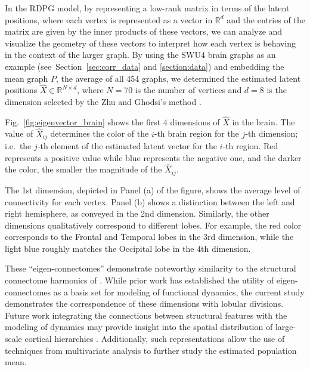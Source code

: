 \documentclass[journal,twoside,web]{ieeecolor}
\renewcommand{\Re}{\mathbb{R}}
\begin{document}
In the RDPG model, by representing a low-rank matrix in terms of the latent positions, where each vertex is represented as a vector in $\Re^d$ and the entries of the matrix are given by the inner products of these vectors, we can analyze and visualize the geometry of these vectors to interpret how each vertex is behaving in the context of the larger graph. 
By using the SWU4 brain graphs as an example (see~Section~\ref{sec:corr_data} and \ref{section:data}) and embedding the mean graph $P$, the average of all 454 graphs, we determined the estimated latent positions $\hat{X} \in \mathbb{R}^{N\times d}$, where $N=70$ is the number of vertices and $d = 8$ is the dimension selected by the Zhu and Ghodsi's method \cite{zhu2006automatic}.

Fig.~\ref{fig:eigenvector_brain} shows the first 4 dimensions of $\hat{X}$ in the brain. The value of $\hat{X}_{ij}$ determines the color of the $i$-th brain region for the $j$-th dimension; i.e.\ the $j$-th element of the estimated latent vector for the $i$-th region. Red represents a positive value while blue represents the negative one, and the darker the color, the smaller the magnitude of the $\hat{X}_{ij}$.

The 1st dimension, depicted in Panel (a) of the figure, shows the average level of connectivity for each vertex. %
Panel (b) shows  a distinction between the left and right hemisphere, as conveyed in the 2nd dimension. Similarly, the other dimensions qualitatively correspond to different lobes.
For example, the red color corresponds to the Frontal and Temporal lobes in the 3rd dimension, while the light blue roughly matches the Occipital lobe in the 4th dimension. 

These ``eigen-connectomes'' demonstrate noteworthy similarity to the structural connectome harmonics of \cite{Atasoy2016-ip}.
While prior work has established the utility of eigen-connectomes as a basis set for modeling of functional dynamics, the current study demonstrates the correspondence of these dimensions with lobular divisions.
Future work integrating the connections between structural features with the modeling of dynamics may provide insight into the spatial distribution of large-scale cortical hierarchies \cite{Margulies2016-jj}.
Additionally, such representations allow the use of techniques from multivariate analysis to further study the estimated population mean.
\end{document}
